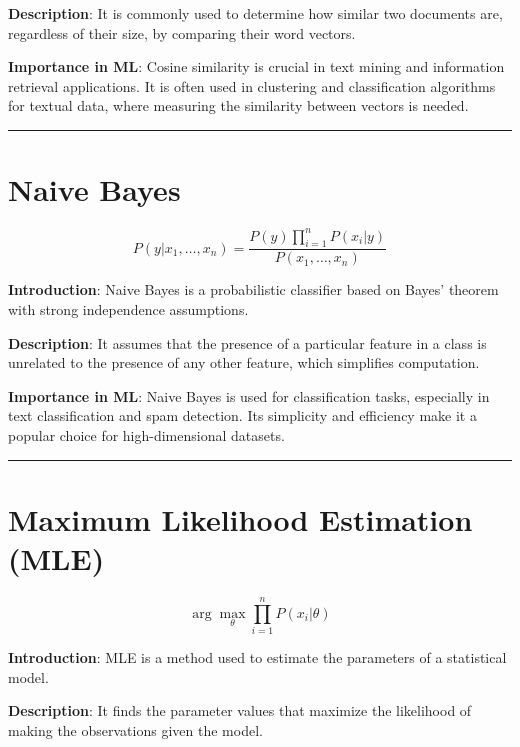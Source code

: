 \documentclass[
  12 pt,
  a4paper,
]{book}
\numberwithin{equation}{section}
\theoremstyle{plain}      %
\theoremstyle{definition} %
\theoremstyle{remark}     %
\theoremstyle{note}         %
\begin{document}
\textbf{Description}: It is commonly used to determine how similar two
documents are, regardless of their size, by comparing their word
vectors.

\textbf{Importance in ML}: Cosine similarity is crucial in text mining
and information retrieval applications. It is often used in clustering
and classification algorithms for textual data, where measuring the
similarity between vectors is needed.

\begin{center}\rule{0.5\linewidth}{0.5pt}\end{center}

\newpage

\hypertarget{naive-bayes}{%
\chapter{Naive Bayes}\label{naive-bayes}}

\[
P(y | x_1, \ldots, x_n) = \frac{P(y) \prod_{i=1}^{n} P(x_i | y)}{P(x_1, \ldots, x_n)}
\]

\textbf{Introduction}: Naive Bayes is a probabilistic classifier based
on Bayes' theorem with strong independence assumptions.

\textbf{Description}: It assumes that the presence of a particular
feature in a class is unrelated to the presence of any other feature,
which simplifies computation.

\textbf{Importance in ML}: Naive Bayes is used for classification tasks,
especially in text classification and spam detection. Its simplicity and
efficiency make it a popular choice for high-dimensional datasets.

\begin{center}\rule{0.5\linewidth}{0.5pt}\end{center}

\newpage

\hypertarget{maximum-likelihood-estimation-mle}{%
\chapter{Maximum Likelihood Estimation
(MLE)}\label{maximum-likelihood-estimation-mle}}

\[
\arg\max_{\theta} \prod_{i=1}^n P(x_i | \theta)
\]

\textbf{Introduction}: MLE is a method used to estimate the parameters
of a statistical model.

\textbf{Description}: It finds the parameter values that maximize the
likelihood of making the observations given the model.
\end{document}
